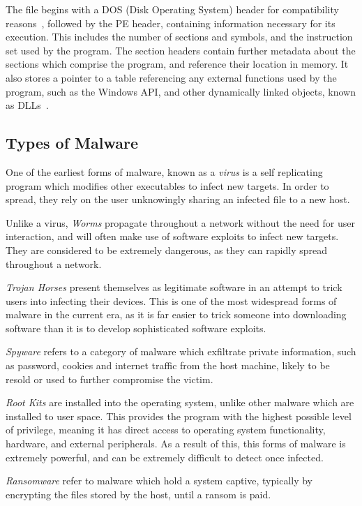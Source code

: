 \documentclass[twocolumn]{article}
\begin{document}
The file begins with a DOS (Disk Operating System) header for compatibility reasons~\cite{karl-bridge-microsoft_pe_2024}, followed by the PE header, containing information necessary for its execution. This includes the number of sections and symbols, and the instruction set used by the program. The section headers contain further metadata about the sections which comprise the program, and reference their location in memory. It also stores a pointer to a table referencing any external functions used by the program, such as the Windows API\@, and other dynamically linked objects, known as DLLs~\cite{deland-han_dynamic_2024}. 


\subsection{Types of Malware}\label{sec:malware-types}

One of the earliest forms of malware, known as a \emph{virus} is a self replicating program which modifies other executables to infect new targets. In order to spread, they rely on the user unknowingly sharing an infected file to a new host. 

Unlike a virus, \emph{Worms} propagate throughout a network without the need for user interaction, and will often make use of software exploits to infect new targets. They are considered to be extremely dangerous, as they can rapidly spread throughout a network.

\emph{Trojan Horses} present themselves as legitimate software in an attempt to trick users into infecting their devices. This is one of the most widespread forms of malware in the current era, as it is far easier to trick someone into downloading software than it is to develop sophisticated software exploits. 

\emph{Spyware} refers to a category of malware which exfiltrate private information, such as password, cookies and internet traffic from the host machine, likely to be resold or used to further compromise the victim. 

\emph{Root Kits} are installed into the operating system, unlike other malware which are installed to user space. This provides the program with the highest possible level of privilege, meaning it has direct access to operating system functionality, hardware, and external peripherals. As a result of this, this forms of malware is extremely powerful, and can be extremely difficult to detect once infected. 

\emph{Ransomware} refer to malware which hold a system captive, typically by encrypting the files stored by the host, until a ransom is paid. 
\end{document}
